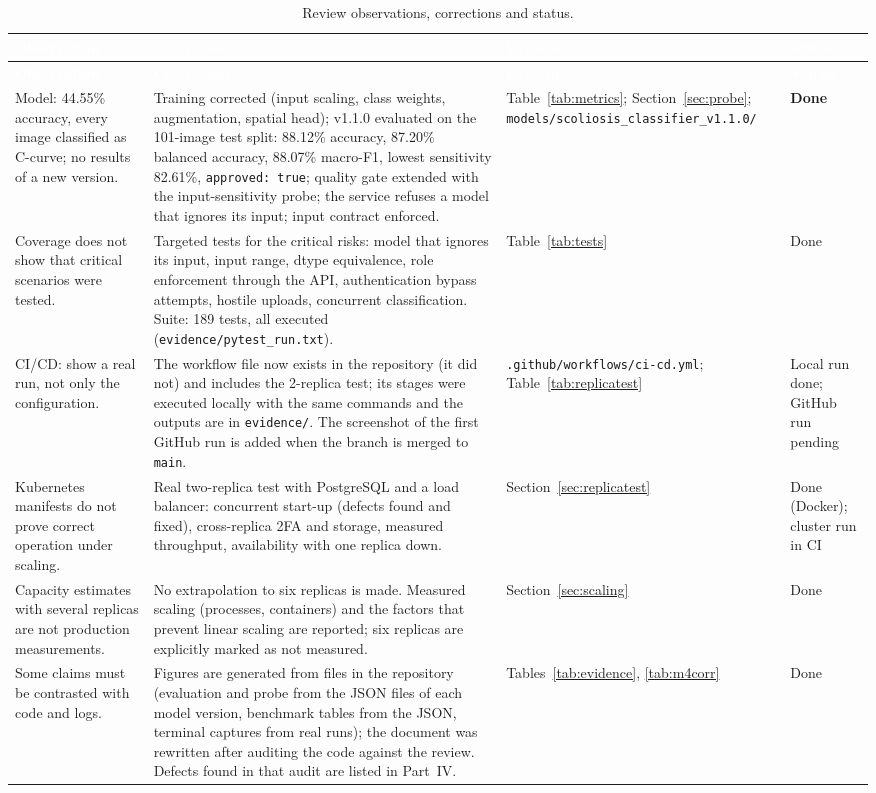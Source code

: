 \documentclass[12pt,a4paper]{article}
\newcommand{\fp}[1]{\nolinkurl{#1}}
\newcommand{\hd}[1]{\textcolor{white}{\textbf{#1}}}
\begin{document}
\begin{longtable}{L{3.0cm} p{6.0cm} L{3.0cm} L{2.5cm}}
\caption{Review observations, corrections and status.}\label{tab:response}\\
\hd{Observation} & \hd{Correction} & \hd{Evidence} & \hd{Status} \\
\endfirsthead
{}
\hd{Observation} & \hd{Correction} & \hd{Evidence} & \hd{Status} \\
\endhead
{}
Model: 44.55\% accuracy, every image classified as C-curve; no results of a new version. & Training corrected (input scaling, class weights, augmentation, spatial head); v1.1.0 evaluated on the 101-image test split: 88.12\% accuracy, 87.20\% balanced accuracy, 88.07\% macro-F1, lowest sensitivity 82.61\%, \texttt{approved: true}; quality gate extended with the input-sensitivity probe; the service refuses a model that ignores its input; input contract enforced. & Table~\ref{tab:metrics}; Section~\ref{sec:probe}; \fp{models/scoliosis_classifier_v1.1.0/} & \textbf{Done} \\
Coverage does not show that critical scenarios were tested. & Targeted tests for the critical risks: model that ignores its input, input range, dtype equivalence, role enforcement through the API, authentication bypass attempts, hostile uploads, concurrent classification. Suite: 189 tests, all executed (\fp{evidence/pytest_run.txt}). & Table~\ref{tab:tests} & Done \\
CI/CD: show a real run, not only the configuration. & The workflow file now exists in the repository (it did not) and includes the 2-replica test; its stages were executed locally with the same commands and the outputs are in \fp{evidence/}. The screenshot of the first GitHub run is added when the branch is merged to \texttt{main}. & \fp{.github/workflows/ci-cd.yml}; Table~\ref{tab:replicatest} & Local run done; GitHub run pending \\
Kubernetes manifests do not prove correct operation under scaling. & Real two-replica test with PostgreSQL and a load balancer: concurrent start-up (defects found and fixed), cross-replica 2FA and storage, measured throughput, availability with one replica down. & Section~\ref{sec:replicatest} & Done (Docker); cluster run in CI \\
Capacity estimates with several replicas are not production measurements. & No extrapolation to six replicas is made. Measured scaling (processes, containers) and the factors that prevent linear scaling are reported; six replicas are explicitly marked as not measured. & Section~\ref{sec:scaling} & Done \\
Some claims must be contrasted with code and logs. & Figures are generated from files in the repository (evaluation and probe from the JSON files of each model version, benchmark tables from the JSON, terminal captures from real runs); the document was rewritten after auditing the code against the review. Defects found in that audit are listed in Part~IV. & Tables~\ref{tab:evidence}, \ref{tab:m4corr} & Done \\
\end{longtable}
\end{document}
